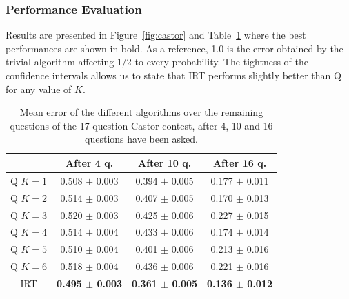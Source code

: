 \documentclass{edm_template}
\begin{document}
\subsubsection{Performance Evaluation}

Results are presented in Figure~\ref{fig:castor} and Table~\ref{tab:error} where the best performances are shown in bold. As a reference, 1.0 is the error obtained by the trivial algorithm affecting 1/2 to every probability. The tightness of the confidence intervals allows us to state that IRT performs slightly better than Q for any value of $K$. %

\begin{table}
\small\centering\begin{tabular}{@{}c|ccc@{}}
& After 4 q. & After 10 q. & After 16 q.\\
\hline
Q $K = 1$ & 0.508 $\pm$ 0.003 & 0.394 $\pm$ 0.005 & 0.177 $\pm$ 0.011 \\
Q $K = 2$ & 0.514 $\pm$ 0.003 & 0.407 $\pm$ 0.005 & 0.170 $\pm$ 0.013 \\
Q $K = 3$ & 0.520 $\pm$ 0.003 & 0.425 $\pm$ 0.006 & 0.227 $\pm$ 0.015 \\
Q $K = 4$ & 0.514 $\pm$ 0.004 & 0.433 $\pm$ 0.006 & 0.174 $\pm$ 0.014 \\
Q $K = 5$ & 0.510 $\pm$ 0.004 & 0.401 $\pm$ 0.006 & 0.213 $\pm$ 0.016 \\
Q $K = 6$ & 0.518 $\pm$ 0.004 & 0.436 $\pm$ 0.006 & 0.221 $\pm$ 0.016 \\
IRT & \textbf{0.495 $\pm$ 0.003} & \textbf{0.361 $\pm$ 0.005} & \textbf{0.136 $\pm$ 0.012} \\
\end{tabular}
\caption{Mean error of the different algorithms over the remaining questions of the 17-question Castor contest, after 4, 10 and 16 questions have been asked.}
\label{tab:error}
\end{table}
\end{document}
